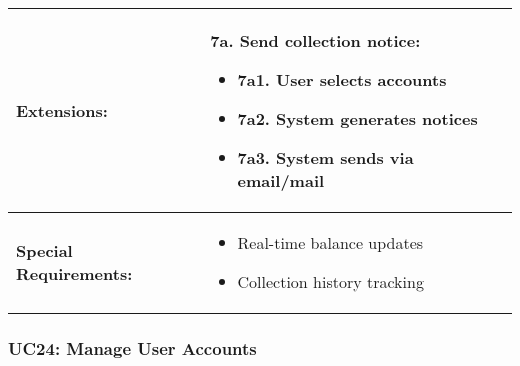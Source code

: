 \documentclass[12pt]{article}
\begin{document}
\begin{longtable}{|p{3cm}|p{11cm}|}
\hline
\textbf{Extensions:} & 
\textbf{7a. Send collection notice:}
\begin{itemize}
    \item 7a1. User selects accounts
    \item 7a2. System generates notices
    \item 7a3. System sends via email/mail
\end{itemize} \\
\hline
\textbf{Special Requirements:} & 
\begin{itemize}
    \item Real-time balance updates
    \item Collection history tracking
\end{itemize} \\
\hline
\end{longtable}


\subsubsection{UC24: Manage User Accounts}
\end{document}
